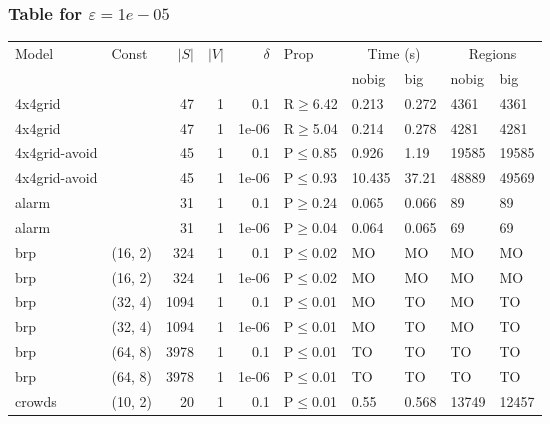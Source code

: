 \subsubsection{Table for \(\varepsilon=1e-05\)}
\begin{longtable}{llrrrlllll}

        \toprule
        Model & Const & $|S|$ & $|V|$ & $\delta$ & Prop & \multicolumn{2}{c}{Time (s)} & \multicolumn{2}{c}{Regions} \\
        \cmidrule(ll){7-8} \cmidrule(ll){9-10}
        & & & & & & nobig & big & nobig & big \\
        \midrule
        
 4x4grid       &           &     	47 & 1 & 0.1   & R$\geq$6.42  & 0.213   & 0.272    & 4361    & 4361    \\
 4x4grid       &           &     	47 & 1 & 1e-06 & R$\geq$5.04  & 0.214   & 0.278    & 4281    & 4281    \\
 4x4grid-avoid &           &     	45 & 1 & 0.1   & P$\leq$0.85  & 0.926   & 1.19     & 19585   & 19585   \\
 4x4grid-avoid &           &     	45 & 1 & 1e-06 & P$\leq$0.93  & 10.435  & 37.21    & 48889   & 49569   \\
 alarm         &           &     	31 & 1 & 0.1   & P$\geq$0.24  & 0.065   & 0.066    & 89      & 89      \\
 alarm         &           &     	31 & 1 & 1e-06 & P$\geq$0.04  & 0.064   & 0.065    & 69      & 69      \\
 brp           & (16, 2)   &    	324 & 1 & 0.1   & P$\leq$0.02  & MO      & MO       & MO      & MO      \\
 brp           & (16, 2)   &    	324 & 1 & 1e-06 & P$\leq$0.02  & MO      & MO       & MO      & MO      \\
 brp           & (32, 4)   &   	1094 & 1 & 0.1   & P$\leq$0.01  & MO      & TO       & MO      & TO      \\
 brp           & (32, 4)   &   	1094 & 1 & 1e-06 & P$\leq$0.01  & MO      & TO       & MO      & TO      \\
 brp           & (64, 8)   &   	3978 & 1 & 0.1   & P$\leq$0.01  & TO      & TO       & TO      & TO      \\
 brp           & (64, 8)   &   	3978 & 1 & 1e-06 & P$\leq$0.01  & TO      & TO       & TO      & TO      \\
 crowds        & (10, 2)   &     	20 & 1 & 0.1   & P$\leq$0.01  & 0.55    & 0.568    & 13749   & 12457   \\

\end{longtable}
